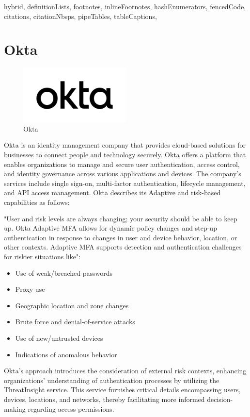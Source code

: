 \documentclass[
  digital,     %
  oneside,     %
  nosansbold,  %
  nocolorbold, %
  lof,         %
  lot,         %
]{fithesis4}
\begin{document}
\begin{markdown*}{%
  hybrid,
  definitionLists,
  footnotes,
  inlineFootnotes,
  hashEnumerators,
  fencedCode,
  citations,
  citationNbsps,
  pipeTables,
  tableCaptions,
}
\newpage
\section{Okta}

\begin{figure}[htbp]
  \centering
  \includegraphics[width=0.5\textwidth]{img/okta.png}
  \caption{Okta}
  \label{fig:okta-logo}
\end{figure}

Okta is an identity management company that provides cloud-based solutions for businesses to connect people and technology securely.
Okta offers a platform that enables organizations to manage and secure user authentication, access control, and identity governance across various applications and devices.
The company's services include single sign-on, multi-factor authentication, lifecycle management, and API access management.
Okta describes its Adaptive and risk-based capabilities as follows:

"User and risk levels are always changing; your security should be able to keep up.
Okta Adaptive MFA allows for dynamic policy changes and step-up authentication in response to changes in user and device behavior, location, or other contexts.
Adaptive MFA supports detection and authentication challenges for riskier situations like":


\begin{itemize}
    \item Use of weak/breached passwords
    \item Proxy use
    \item Geographic location and zone changes
    \item Brute force and denial-of-service attacks
    \item Use of new/untrusted devices
    \item Indications of anomalous behavior \cite{existing-okta}
\end{itemize}

\newpage
Okta's approach introduces the consideration of external risk contexts, enhancing organizations' understanding of authentication processes by utilizing the ThreatInsight service.
This service furnishes critical details encompassing users, devices, locations, and networks, thereby facilitating more informed decision-making regarding access permissions.


\end{markdown*}
\end{document}

